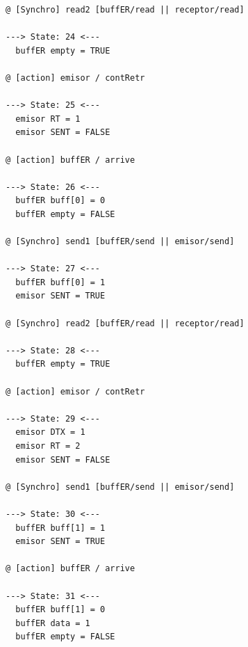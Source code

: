 \documentclass[pdftex,a4paper,12pt]{book}
\begin{document}
{\begin{verbatim}
@ [Synchro] read2 [buffER/read || receptor/read]

---> State: 24 <---
  buffER empty = TRUE

@ [action] emisor / contRetr

---> State: 25 <---
  emisor RT = 1
  emisor SENT = FALSE

@ [action] buffER / arrive

---> State: 26 <---
  buffER buff[0] = 0
  buffER empty = FALSE

@ [Synchro] send1 [buffER/send || emisor/send]

---> State: 27 <---
  buffER buff[0] = 1
  emisor SENT = TRUE

@ [Synchro] read2 [buffER/read || receptor/read]

---> State: 28 <---
  buffER empty = TRUE

@ [action] emisor / contRetr

---> State: 29 <---
  emisor DTX = 1
  emisor RT = 2
  emisor SENT = FALSE

@ [Synchro] send1 [buffER/send || emisor/send]

---> State: 30 <---
  buffER buff[1] = 1
  emisor SENT = TRUE

@ [action] buffER / arrive

---> State: 31 <---
  buffER buff[1] = 0
  buffER data = 1
  buffER empty = FALSE
\end{verbatim}
}


\newpage %
\end{document}
